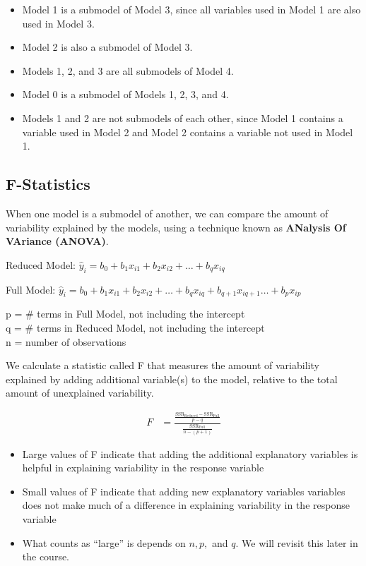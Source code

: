 \documentclass[
  letterpaper,
  DIV=11,
  numbers=noendperiod]{scrreprt}
\providecommand{\tightlist}{%
  \setlength{\itemsep}{0pt}\setlength{\parskip}{0pt}}\usepackage{longtable,booktabs,array}
\begin{document}
\begin{itemize}
\item
  Model 1 is a submodel of Model 3, since all variables used in Model 1
  are also used in Model 3.
\item
  Model 2 is also a submodel of Model 3.
\item
  Models 1, 2, and 3 are all submodels of Model 4.
\item
  Model 0 is a submodel of Models 1, 2, 3, and 4.
\item
  Models 1 and 2 are not submodels of each other, since Model 1 contains
  a variable used in Model 2 and Model 2 contains a variable not used in
  Model 1.
\end{itemize}

\subsection{F-Statistics}\label{f-statistics}

When one model is a submodel of another, we can compare the amount of
variability explained by the models, using a technique known as
\textbf{ANalysis Of VAriance (ANOVA)}.

Reduced Model:
\(\hat{y}_i = b_0 + b_1x_{i1} + b_2x_{i2} + \ldots + b_qx_{iq}\)

Full Model:
\(\hat{y}_i = b_0 + b_1x_{i1} + b_2x_{i2} + \ldots + b_qx_{iq} + b_{q+1}x_{i{q+1}} \ldots + b_px_{ip}\)

p = \# terms in Full Model, not including the intercept\\
q = \# terms in Reduced Model, not including the intercept\\
n = number of observations

We calculate a statistic called F that measures the amount of
variability explained by adding additional variable(s) to the model,
relative to the total amount of unexplained variability.

\[
\begin{aligned}
F  
&= \frac{\frac{\text{SSR}_{\text{Reduced}}-\text{SSR}_{\text{Full}}}{p-q}}{\frac{\text{SSR}_{\text{Full}}}{n-(p+1)}}
\end{aligned}
\]

\begin{itemize}
\tightlist
\item
  Large values of F indicate that adding the additional explanatory
  variables is helpful in explaining variability in the response
  variable\\
\item
  Small values of F indicate that adding new explanatory variables
  variables does not make much of a difference in explaining variability
  in the response variable\\
\item
  What counts as ``large'' is depends on \(n, p,\) and \(q\). We will
  revisit this later in the course.
\end{itemize}
\end{document}
